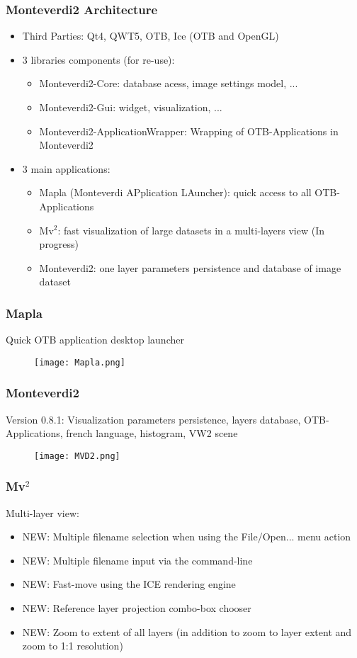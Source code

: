 \documentclass[8pt]{beamer}
\begin{document}
\begin{frame}
\frametitle{Monteverdi2 Architecture}
\begin{itemize}
    \item Third Parties: Qt4, QWT5, OTB, Ice (OTB and OpenGL)
    \item 3 libraries components (for re-use): 
        \begin{itemize}
            \item Monteverdi2-Core: database acess, image settings model, ...
            \item Monteverdi2-Gui: widget, visualization, ...
            \item Monteverdi2-ApplicationWrapper: Wrapping of OTB-Applications in Monteverdi2
        \end{itemize}
    \item 3 main applications:
        \begin{itemize}
            \item Mapla (Monteverdi APplication LAuncher): quick access to all OTB-Applications
            \item Mv$^{2}$: fast visualization of large datasets in a multi-layers view (In progress)
            \item Monteverdi2: one layer parameters persistence and database of image dataset
        \end{itemize}    
\end{itemize} 
\end{frame}

\begin{frame}
\frametitle{Mapla}
Quick OTB application desktop launcher
\begin{figure}[hbtp]
    \centering
    \texttt{[image: Mapla.png]} 
\end{figure}
\end{frame}

\begin{frame}
\frametitle{Monteverdi2}
Version 0.8.1: Visualization parameters persistence, layers database, OTB-Applications, french language, histogram, VW2 scene 
\begin{figure}[hbtp]
    \centering
    \texttt{[image: MVD2.png]} 
\end{figure}
\end{frame}

\begin{frame}
\frametitle{Mv$^{2}$}
Multi-layer view:
\begin{itemize}
 \item NEW: Multiple filename selection when using the File/Open... menu action
 \item NEW: Multiple filename input via the command-line
 \item NEW: Fast-move using the ICE rendering engine
 \item NEW: Reference layer projection combo-box chooser
 \item NEW: Zoom to extent of all layers (in addition to zoom to layer extent and zoom to 1:1 resolution)
\end{itemize}
\end{frame}
\end{document}
